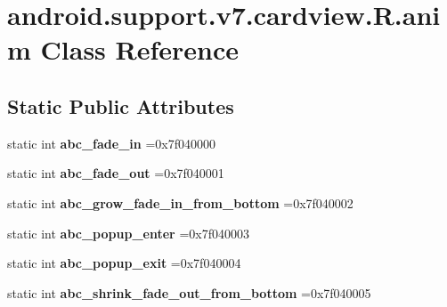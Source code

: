 \hypertarget{classandroid_1_1support_1_1v7_1_1cardview_1_1R_1_1anim}{}\section{android.\+support.\+v7.\+cardview.\+R.\+anim Class Reference}
\label{classandroid_1_1support_1_1v7_1_1cardview_1_1R_1_1anim}
\subsection*{Static Public Attributes}
\begin{DoxyCompactItemize}
\item 
\mbox{\label{classandroid_1_1support_1_1v7_1_1cardview_1_1R_1_1anim_a6776edb9b44bac279f8d436731e9559f}} 
static int {\bfseries abc\+\_\+fade\+\_\+in} =0x7f040000
\item 
\mbox{\label{classandroid_1_1support_1_1v7_1_1cardview_1_1R_1_1anim_a510fa82eb528d1da86db9254ae218c3c}} 
static int {\bfseries abc\+\_\+fade\+\_\+out} =0x7f040001
\item 
\mbox{\label{classandroid_1_1support_1_1v7_1_1cardview_1_1R_1_1anim_ad3d05f732bf69c5a581ee4eaf6b3ea2e}} 
static int {\bfseries abc\+\_\+grow\+\_\+fade\+\_\+in\+\_\+from\+\_\+bottom} =0x7f040002
\item 
\mbox{\label{classandroid_1_1support_1_1v7_1_1cardview_1_1R_1_1anim_aacf472a3d059f4403c1285c87b2c034a}} 
static int {\bfseries abc\+\_\+popup\+\_\+enter} =0x7f040003
\item 
\mbox{\label{classandroid_1_1support_1_1v7_1_1cardview_1_1R_1_1anim_a67b0f7d37b50a0cf9733d58348a7a57a}} 
static int {\bfseries abc\+\_\+popup\+\_\+exit} =0x7f040004
\item 
\mbox{\label{classandroid_1_1support_1_1v7_1_1cardview_1_1R_1_1anim_a225ba2f7fc38fbddb4f6832e7ddfef7b}} 
static int {\bfseries abc\+\_\+shrink\+\_\+fade\+\_\+out\+\_\+from\+\_\+bottom} =0x7f040005

\end{DoxyCompactItemize}
